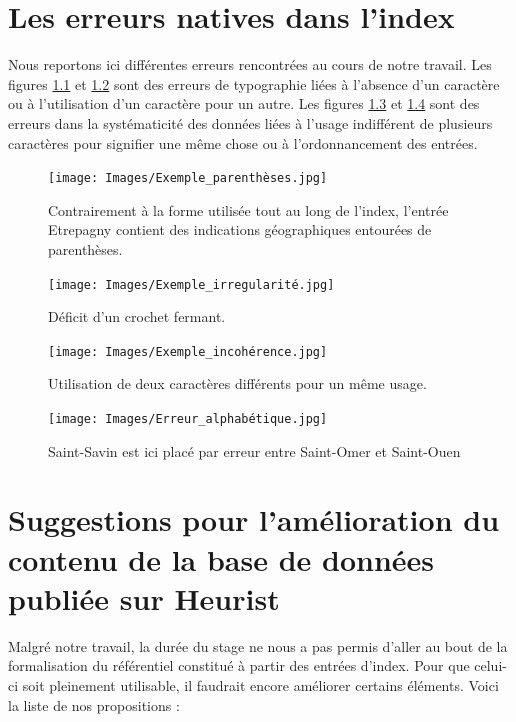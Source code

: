 \documentclass[a4paper,12pt,twoside]{book}
\begin{document}
	\chapter{Les erreurs natives dans l'index}
	
	Nous reportons ici différentes erreurs rencontrées au cours de notre travail. Les figures \ref{Parenthèses_pour_crochets} et \ref{Irregularité_crochets} sont des erreurs de typographie liées à l'absence d'un caractère ou à l'utilisation d'un caractère pour un autre. Les figures \ref{Marquage_non_systématique} et \ref{Erreur_alphabétique} sont des erreurs dans la systématicité des données liées à l'usage indifférent de plusieurs caractères pour signifier une même chose ou à l'ordonnancement des entrées.
	
	\pagebreak
	
	\begin{figure}
		\centering
		\texttt{[image: Images/Exemple\_parenthèses.jpg]}
		\caption{Contrairement à la forme utilisée tout au long de l'index, l'entrée \og Etrepagny\fg{} contient des indications géographiques entourées de parenthèses.}
		\label{Parenthèses_pour_crochets}
	\end{figure}
	
	\begin{figure}
		\centering
		\texttt{[image: Images/Exemple\_irregularité.jpg]}
		\caption{Déficit d'un crochet fermant.}
		\label{Irregularité_crochets}
	\end{figure}

	\begin{figure}
		\centering
		\texttt{[image: Images/Exemple\_incohérence.jpg]}
		\caption{Utilisation de deux caractères différents pour un même usage.}
		\label{Marquage_non_systématique}
	\end{figure}

	\begin{figure}
		\centering
		\texttt{[image: Images/Erreur\_alphabétique.jpg]}
		\caption{\og Saint-Savin\fg{} est ici placé par erreur entre \og Saint-Omer\fg{} et \og Saint-Ouen\fg{}}
		\label{Erreur_alphabétique}
	\end{figure}
	
	\chapter{Suggestions pour l'amélioration du contenu de la base de données publiée sur Heurist}
	
	Malgré notre travail, la durée du stage ne nous a pas permis d'aller au bout de la formalisation du référentiel constitué à partir des entrées d'index. Pour que celui-ci soit pleinement utilisable, il faudrait encore améliorer certains éléments. Voici la liste de nos propositions : 
	
\end{document}
